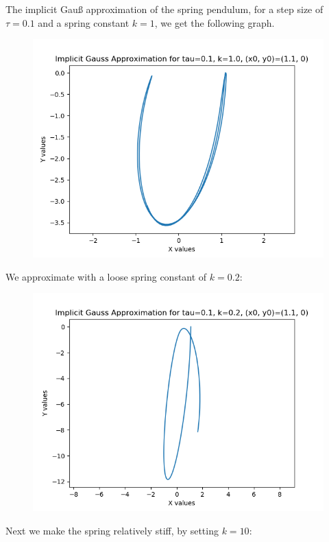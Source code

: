 \documentclass{article}
\theoremstyle{definition}
\begin{document}
\begin{itemize}
		The implicit Gau{\ss} approximation of the spring pendulum, for
		a step size of $\tau=0.1$ and a spring constant $k=1$, we get
		the following graph.
		\begin{figure}[H]
			\includegraphics[scale=0.6]{gauss_spring_01_1}
		\end{figure}
		We approximate with a loose spring constant of $k=0.2$:
		\begin{figure}[H]
			\includegraphics[scale=0.6]{gauss_spring_01_02}
		\end{figure}
		Next we make the spring relatively stiff, by setting $k=10$:
		\begin{figure}[H]

\end{figure}
\end{itemize}
\end{document}
